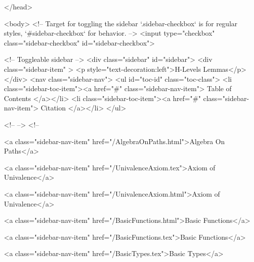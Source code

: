   
</head>




  <body>
    <!-- Target for toggling the sidebar `.sidebar-checkbox` is for regular
     styles, `#sidebar-checkbox` for behavior. -->
<input type="checkbox" class="sidebar-checkbox" id="sidebar-checkbox">

<!-- Toggleable sidebar -->
<div class="sidebar" id="sidebar">
  <div class="sidebar-item" >
    <p style="text-decoration:left">H-Levels Lemmas</p>
  </div>
  <nav class="sidebar-nav">
    <ul id="toc-id" class="toc-class">
  <li class="sidebar-toc-item"><a href="#" class="sidebar-nav-item"> Table of Contents </a></li>
  <li class="sidebar-toc-item"><a href="#" class="sidebar-nav-item"> Citation </a></li>
</ul>


    <!--  -->
    <!-- 
      
    
      
    
      
    
      
        
      
    
      
        
          <a class="sidebar-nav-item" href="/AlgebraOnPaths.html">Algebra On Paths</a>
        
      
    
      
        
          <a class="sidebar-nav-item" href="/UnivalenceAxiom.tex">Axiom of Univalence</a>
        
      
    
      
        
          <a class="sidebar-nav-item" href="/UnivalenceAxiom.html">Axiom of Univalence</a>
        
      
    
      
        
          <a class="sidebar-nav-item" href="/BasicFunctions.html">Basic Functions</a>
        
      
    
      
        
          <a class="sidebar-nav-item" href="/BasicFunctions.tex">Basic Functions</a>
        
      
    
      
        
          <a class="sidebar-nav-item" href="/BasicTypes.tex">Basic Types</a>
        
      
    
      
        
